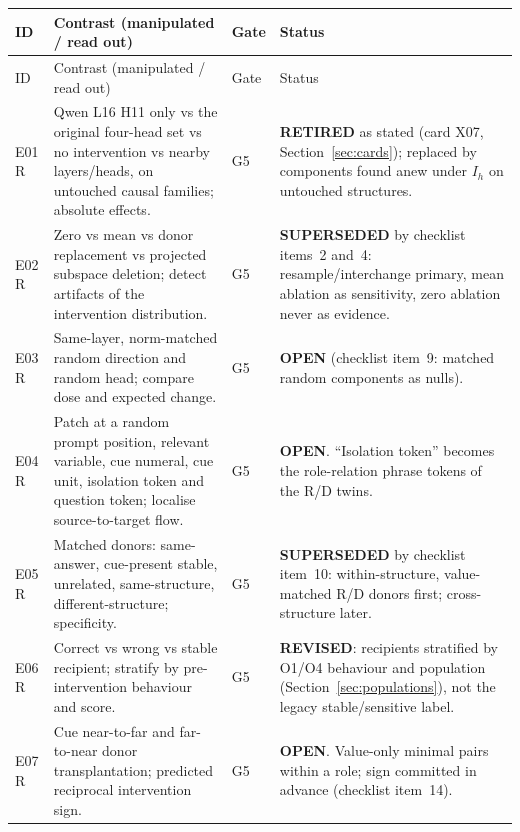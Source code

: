 \documentclass[10pt,a4paper]{article}
\begin{document}
\begingroup\small
\begin{longtable}{@{}P{1.2cm}P{7.2cm}P{1.3cm}P{5.6cm}@{}}
\toprule
ID & Contrast (manipulated / read out) & Gate & Status \\
\midrule
\endfirsthead
\toprule
ID & Contrast (manipulated / read out) & Gate & Status \\
\midrule
\endhead
\bottomrule
\endfoot
E01 \newline R & Qwen L16 H11 only vs the original four-head set vs no intervention vs nearby layers/heads, on untouched causal families; absolute effects. & G5 &
\textbf{RETIRED} as stated (card X07, Section~\ref{sec:cards}); replaced by components found anew under $I_h$ on untouched structures. \\
E02 \newline R & Zero vs mean vs donor replacement vs projected subspace deletion; detect artifacts of the intervention distribution. & G5 &
\textbf{SUPERSEDED} by checklist items~2 and~4: resample/interchange primary, mean ablation as sensitivity, zero ablation never as evidence. \\
E03 \newline R & Same-layer, norm-matched random direction and random head; compare dose and expected change. & G5 &
\textbf{OPEN} (checklist item~9: matched random components as nulls). \\
E04 \newline R & Patch at a random prompt position, relevant variable, cue numeral, cue unit, isolation token and question token; localise source-to-target flow. & G5 &
\textbf{OPEN}. ``Isolation token'' becomes the role-relation phrase tokens of the R/D twins. \\
E05 \newline R & Matched donors: same-answer, cue-present stable, unrelated, same-structure, different-structure; specificity. & G5 &
\textbf{SUPERSEDED} by checklist item~10: within-structure, value-matched R/D donors first; cross-structure later. \\
E06 \newline R & Correct vs wrong vs stable recipient; stratify by pre-intervention behaviour and score. & G5 &
\textbf{REVISED}: recipients stratified by O1/O4 behaviour and population (Section~\ref{sec:populations}), not the legacy stable/sensitive label. \\
E07 \newline R & Cue near-to-far and far-to-near donor transplantation; predicted reciprocal intervention sign. & G5 &
\textbf{OPEN}. Value-only minimal pairs within a role; sign committed in advance (checklist item~14). \\

\end{longtable}
\end{document}
